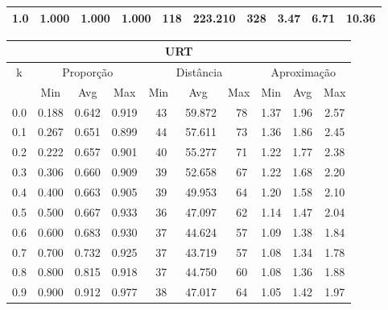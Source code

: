 \begin{table}[!tbh]
\begin{center}
{\begin{tabular}{|c|c|c|c|c|c|c|c|c|c|}
1.0                & 1.000     & 1.000    & 1.000    & 118      & 223.210  & 328     & 3.47    & 6.71  & 10.36            \\ \hline
\end{tabular}%
\vspace{5pt}
\begin{tabular}{|c|c|c|c|c|c|c|c|c|c|}
\hline
\multicolumn{10}{|c|}{\bf URT}                                                                                            \\ \hline
\multirow{2}{*}{k} & \multicolumn{3}{c|}{Proporção}  & \multicolumn{3}{c|}{Distância} & \multicolumn{3}{c|}{Aproximação}  \\ \cline{2-10}
                   & Min       & Avg      & Max      & Min      & Avg      & Max     & Min     & Avg   & Max              \\ \hline
0.0                & 0.188     & 0.642    & 0.919    & ~43      & ~59.872  & ~78     & 1.37    & 1.96  & 2.57             \\ \hline
0.1                & 0.267     & 0.651    & 0.899    & ~44      & ~57.611  & ~73     & 1.36    & 1.86  & 2.45             \\ \hline
0.2                & 0.222     & 0.657    & 0.901    & ~40      & ~55.277  & ~71     & 1.22    & 1.77  & 2.38             \\ \hline
0.3                & 0.306     & 0.660    & 0.909    & ~39      & ~52.658  & ~67     & 1.22    & 1.68  & 2.20             \\ \hline
0.4                & 0.400     & 0.663    & 0.905    & ~39      & ~49.953  & ~64     & 1.20    & 1.58  & 2.10             \\ \hline
0.5                & 0.500     & 0.667    & 0.933    & ~36      & ~47.097  & ~62     & 1.14    & 1.47  & 2.04             \\ \hline
0.6                & 0.600     & 0.683    & 0.930    & ~37      & ~44.624  & ~57     & 1.09    & 1.38  & 1.84             \\ \hline
0.7                & 0.700     & 0.732    & 0.925    & ~37      & ~43.719  & ~57     & 1.08    & 1.34  & 1.78             \\ \hline
0.8                & 0.800     & 0.815    & 0.918    & ~37      & ~44.750  & ~60     & 1.08    & 1.36  & 1.88             \\ \hline
0.9                & 0.900     & 0.912    & 0.977    & ~38      & ~47.017  & ~64     & 1.05    & 1.42  & 1.97             \\ \hline

\end{tabular}}
\end{center}
\end{table}
